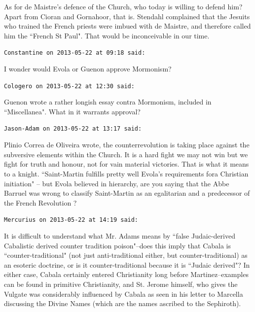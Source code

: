 \begin{footnotesize}
\begin{sffamily}
As for de Maistre's defence of the Church, who today is willing to defend him? Apart from Cioran and Gornahoor, that is. Stendahl complained that the Jesuits who trained the French priests were imbued with de Maistre, and therefore called him the ``French St Paul". That would be inconceivable in our time.


\hfill

\texttt{Constantine on 2013-05-22 at 09:18 said: }

I wonder would Evola or Guenon approve Mormonism?


\hfill

\texttt{Cologero on 2013-05-22 at 12:30 said: }

Guenon wrote a rather longish essay contra Mormonism, included in ``Miscellanea". What in it warrants approval?


\hfill

\texttt{Jason-Adam on 2013-05-22 at 13:17 said: }

Plinio Correa de Oliveira wrote, the counterrevolution is taking place against the subversive elements within the Church. It is a hard fight we may not win but we fight for truth and honour, not for vain material victories. That is what it means to a knight. ``Saint-Martin fulfills pretty well Evola's requirements fora Christian initiation" – but Evola believed in hierarchy, are you saying that the Abbe Barruel was wrong to classify Saint-Martin as an egalitarian and a predecessor of the French Revolution ?


\hfill

\texttt{Mercurius on 2013-05-22 at 14:19 said: }

It is difficult to understand what Mr. Adams means by ``false Judaic-derived Cabalistic derived counter tradition poison"–does this imply that Cabala is ``counter-traditional" (not just anti-traditional either, but counter-traditional) as an esoteric doctrine, or is it counter-traditional because it is ``Judaic derived"? In either case, Cabala certainly entered Christianity long before Martinez–examples can be found in primitive Christianity, and St. Jerome himself, who gives the Vulgate was considerably influenced by Cabala as seen in his letter to Marcella discussing the Divine Names (which are the names ascribed to the Sephiroth). 


\end{sffamily}
\end{footnotesize}
